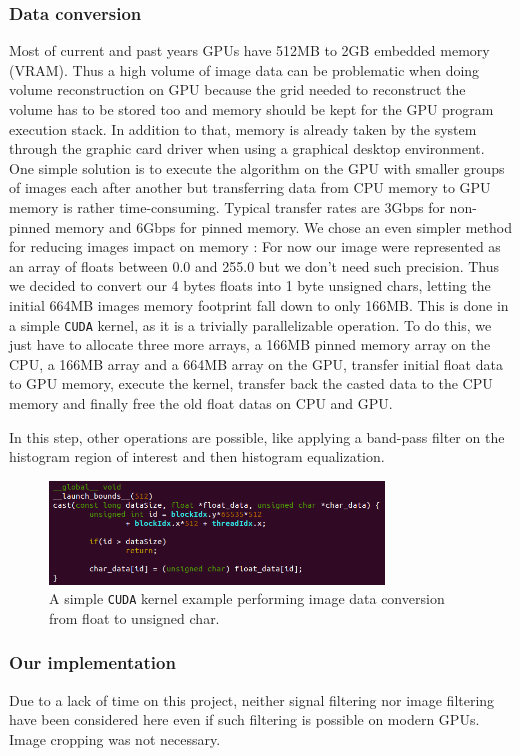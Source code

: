 \documentclass[12pt,journal,compsoc]{IEEEtran}
\begin{document}
\subsubsection{Data conversion}

Most of current and past years GPUs have 512MB to 2GB embedded memory (VRAM). Thus a high volume of image data can be problematic when doing volume reconstruction on GPU because the grid needed to reconstruct the volume has to be stored too and memory should be kept for the GPU program execution stack. In addition to that, memory is already taken by the system through the graphic card driver when using a graphical desktop environment. 
One simple solution is to execute the algorithm on the GPU with smaller groups of images each after another but transferring data from CPU memory to GPU memory is rather time-consuming. 
Typical transfer rates are 3Gbps for non-pinned memory and 6Gbps for pinned memory.
We chose an even simpler method for reducing images impact on memory : For now our image were represented as an array of floats between 0.0 and 255.0 but we don't need such precision.
Thus we decided to convert our 4 bytes floats into 1 byte unsigned chars, letting the initial 664MB images memory footprint fall down to only 166MB.
This is done in a simple \texttt{CUDA} kernel, as it is a trivially parallelizable operation.
To do this, we just have to allocate three more arrays, a 166MB pinned memory array on the CPU, a 166MB array and a 664MB array on the GPU, transfer initial float data to GPU memory, execute the kernel, transfer back the casted data to the CPU memory and finally free the old float datas on CPU and GPU.\par
In this step, other operations are possible, like applying a band-pass filter on the histogram region of interest and then histogram equalization.

\begin{figure}[!ht]
\centering
\includegraphics[width=3.5in]{simple_kernel}
\caption{A simple \texttt{CUDA} kernel example performing image data conversion from float to unsigned char.}
\label{kernel}
\end{figure}
	
\subsubsection{Our implementation}
Due to a lack of time on this project, neither signal filtering nor image filtering have been considered here even if such filtering is possible on modern GPUs. Image cropping was not necessary.
\end{document}
